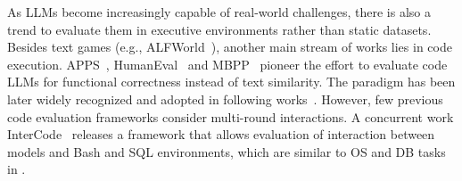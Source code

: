 As LLMs become increasingly capable of real-world challenges, there is also a trend to evaluate them in executive environments rather than static datasets.
Besides text games (e.g., ALFWorld~\citep{shridhar2020alfworld}), another main stream of works lies in code execution.
APPS~\citep{hendrycks2021measuring}, HumanEval~\citep{chen2021evaluating} and MBPP~\citep{austin2021program} pioneer the effort to evaluate code LLMs for functional correctness instead of text similarity.
The paradigm has been later widely recognized and adopted in following works~\citep{li2022competition,zheng2023codegeex,nijkamp2023codegen}.
However, few previous code evaluation frameworks consider multi-round interactions.
A concurrent work InterCode~\citep{yang2023intercode} releases a framework that allows evaluation of interaction between models and Bash and SQL environments, which are similar to OS and DB tasks in \model. 

